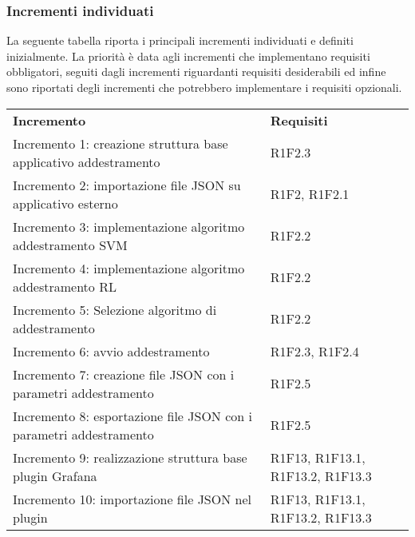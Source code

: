 \subsubsection{Incrementi individuati}
La seguente tabella riporta i principali incrementi individuati e definiti inizialmente. La priorità è data agli incrementi che implementano requisiti obbligatori, seguiti dagli incrementi riguardanti requisiti desiderabili ed infine sono riportati degli incrementi che potrebbero implementare i requisiti opzionali.
\begin{longtable} {
		>{\raggedright\arraybackslash}p{85mm}
		>{\raggedleft\arraybackslash}p{40mm}
	}
	\rowcolor{gray!50} 
	\textbf{Incremento} & 
	\textbf{Requisiti} 	\TBstrut \\
	
	Incremento 1: creazione struttura base applicativo addestramento &
	R1F2.3  \TBstrut \\ [2mm]		
	
	Incremento 2: importazione file JSON su applicativo esterno & 
	R1F2, R1F2.1  \TBstrut \\ [2mm]
	
	Incremento 3: implementazione algoritmo addestramento SVM\glosp & 
	R1F2.2  \TBstrut \\ [2mm]
	
	Incremento 4: implementazione algoritmo addestramento RL\glosp & 
	R1F2.2  \TBstrut \\ [2mm]
	
	Incremento 5: Selezione algoritmo di addestramento & 
	R1F2.2  \TBstrut \\ [2mm]
	
	Incremento 6: avvio addestramento\glosp & 
	R1F2.3, R1F2.4 \TBstrut \\ [2mm]
	
	Incremento 7: creazione file JSON con i parametri addestramento &
	R1F2.5 \TBstrut \\ [2mm]
	
	Incremento 8: esportazione file JSON con i parametri addestramento &
	R1F2.5 \TBstrut \\ [2mm]
	
	Incremento 9: realizzazione struttura base plugin Grafana\glosp &
	R1F13, R1F13.1, R1F13.2, R1F13.3 \TBstrut \\ [2mm]
	
	Incremento 10: importazione file JSON nel plugin &
	R1F13, R1F13.1, R1F13.2, R1F13.3 \TBstrut \\ [2mm]
	

\end{longtable}
